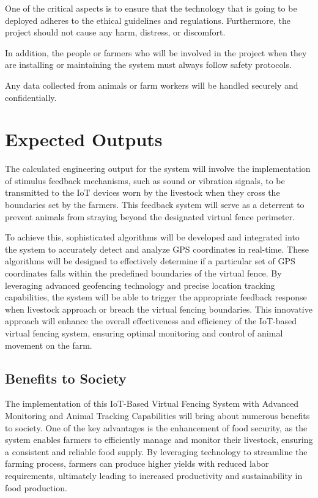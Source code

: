 \documentclass[conference]{main}
\begin{document}
One of the critical aspects is to ensure that the technology that is going to
be deployed adheres to the ethical guidelines and regulations. Furthermore, the
project should not cause any harm, distress, or discomfort.

In addition, the people or farmers who will be involved in the project when they
are installing or maintaining the system must always follow safety protocols.

Any data collected from animals or farm workers will be handled securely and
confidentially.


\section{Expected Outputs}

The calculated engineering output for the system will involve the implementation
of stimulus feedback mechanisms, such as sound or vibration signals, to be
transmitted to the IoT devices worn by the livestock when they cross the
boundaries set by the farmers. This feedback system will serve as a deterrent to
prevent animals from straying beyond the designated virtual fence perimeter.

To achieve this, sophisticated algorithms will be developed and integrated into
the system to accurately detect and analyze GPS coordinates in real-time. These
algorithms will be designed to effectively determine if a particular set of GPS
coordinates falls within the predefined boundaries of the virtual fence. By
leveraging advanced geofencing technology and precise location tracking
capabilities, the system will be able to trigger the appropriate feedback
response when livestock approach or breach the virtual fencing boundaries. This
innovative approach will enhance the overall effectiveness and efficiency of the
IoT-based virtual fencing system, ensuring optimal monitoring and control of
animal movement on the farm.



\subsection{Benefits to Society}

The implementation of this IoT-Based Virtual Fencing System with
Advanced Monitoring and Animal Tracking Capabilities will bring about numerous
benefits to society. One of the key advantages is the enhancement of food
security, as the system enables farmers to efficiently manage and monitor their
livestock, ensuring a consistent and reliable food supply. By leveraging
technology to streamline the farming process, farmers can produce higher yields
with reduced labor requirements, ultimately leading to increased productivity
and sustainability in food production.
\end{document}
